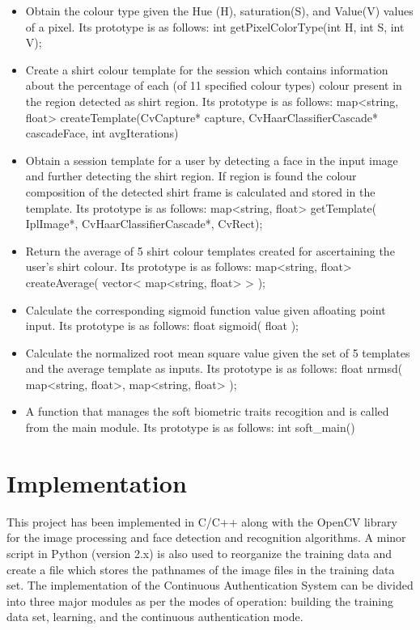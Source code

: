 \documentclass[12pt]{article}			%
\begin{document}
\begin{itemize}
\item Obtain the colour type given the Hue (H), saturation(S), and Value(V) values of a pixel. Its prototype is as follows:
int    getPixelColorType(int H, int S, int V);

\item Create a shirt colour template for the session which contains information about the percentage of each (of 11 specified colour types) colour present in the region detected as shirt region. Its prototype is as follows:
map<string, float> createTemplate(CvCapture* capture, CvHaarClassifierCascade* cascadeFace, int avgIterations)

\item Obtain a session template for a user by detecting a face in the input image and further detecting the shirt region. If region is found the colour composition of the detected shirt frame is calculated and stored in the template. Its prototype is as follows:
map<string, float>  getTemplate( IplImage*, CvHaarClassifierCascade*, CvRect);

\item Return the average of 5 shirt colour templates created for ascertaining the user's shirt colour. Its prototype is as follows:
map<string, float>  createAverage( vector< map<string, float> > );

\item Calculate the corresponding sigmoid function value given afloating point input. Its prototype is as follows:
float    sigmoid( float );

\item Calculate the normalized root mean square value given the set of 5 templates and the average template as inputs. Its prototype is as follows: 
float    nrmsd( map<string, float>, map<string, float> );

\item A function that manages the soft biometric traits recogition and is called from the main module. Its prototype is as follows:
int soft_main()
\end{itemize}


\section{ Implementation }  
This project has been implemented in C/C++ along with the OpenCV library for the image processing and face detection and recognition algorithms. A minor script in Python (version 2.x) is also used to reorganize the training data and create a file which stores the pathnames of the image files in the training data set. The implementation of the Continuous Authentication System can be divided into three major modules as per the modes of operation: building the training data set, learning, and the continuous authentication mode.
\end{document}
